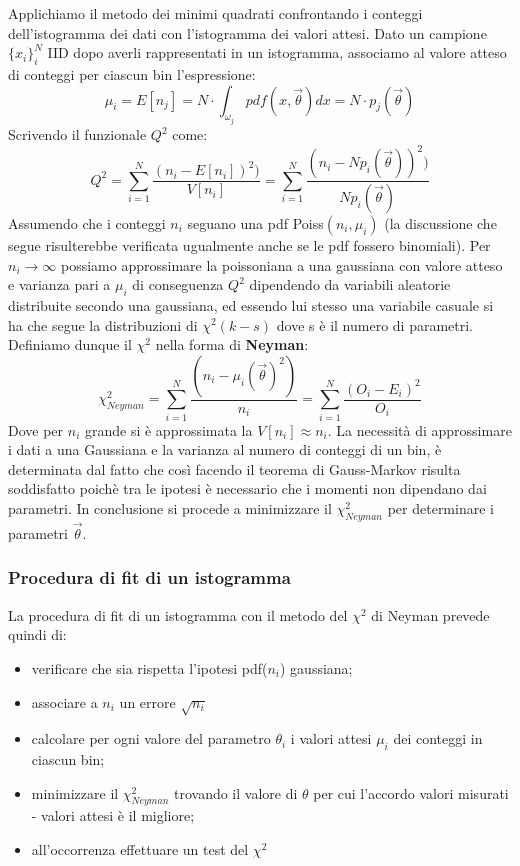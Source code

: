 \documentclass[11pt,a4paper]{book}
\begin{document}
Applichiamo il metodo dei minimi quadrati confrontando i conteggi dell'istogramma dei dati con l'istogramma dei valori attesi. Dato un campione $\{x_i\}_i^N$ IID dopo averli rappresentati in un istogramma, associamo al valore atteso di conteggi per ciascun bin l'espressione:
\begin{equation*}
	\mu_i = E[n_j] = N \cdot \int_{\omega_j}pdf(x, \vec{\theta})dx = N \cdot p_j(\vec{\theta}) 
\end{equation*}
Scrivendo il funzionale $Q^2$ come:
\begin{equation*}
Q^2 = \sum_{i=1}^N\dfrac{(n_i - E[n_i])^2)}{V[n_i]}	 = \sum_{i=1}^N\dfrac{(n_i - Np_i(\vec{\theta}))^2)}{Np_i(\vec{\theta})} 
\end{equation*}
Assumendo che i conteggi $n_i$ seguano una pdf Poiss$(n_i,\mu_i)$ (la discussione che segue risulterebbe verificata ugualmente anche se le pdf fossero binomiali). Per $n_i \rightarrow \infty$ possiamo approssimare la poissoniana a una gaussiana con valore atteso e varianza pari a $\mu_i$ di conseguenza $Q^2$ dipendendo da variabili aleatorie distribuite secondo una gaussiana, ed essendo lui stesso una variabile casuale si ha che segue la distribuzioni di $\chi^2(k-s)$ dove s \`{e} il numero di parametri. Definiamo dunque il $\chi^2$ nella forma di \textbf{Neyman}:
\begin{equation}
	\chi^2_{Neyman} = \sum_{i=1}^N\dfrac{(n_i - \mu_i(\vec{\theta})^2)}{n_i} = \sum_{i=1}^N\dfrac{(O_i - E_i)^2}{O_i}
\end{equation} 
Dove per $n_i$ grande si \`{e} approssimata la $V[n_i] \approx n_i$. La necessit\`{a} di approssimare i dati a una Gaussiana e la varianza al numero di conteggi di un bin, \`{e} determinata dal fatto che cos\`{i} facendo il teorema di Gauss-Markov risulta soddisfatto poich\`{e} tra le ipotesi \`{e} necessario che i momenti non dipendano dai parametri. In conclusione si procede a minimizzare il $\chi^2_{Neyman}$ per determinare i parametri $\vec{\theta}$.

\subsubsection{Procedura di fit di un istogramma}
La procedura di fit di un istogramma con il metodo del $\chi^2$ di Neyman prevede quindi di:

\begin{itemize}
	\item verificare che sia rispetta l'ipotesi pdf($n_i$) gaussiana;
	\item associare a $n_i$ un errore $\sqrt{n_i}$
	\item calcolare per ogni valore del parametro $\theta_i$ i valori attesi $\mu_i$ dei conteggi in ciascun bin;
	\item minimizzare il $\chi^2_{Neyman}$ trovando il valore di $\theta$ per cui l'accordo valori misurati - valori attesi \`{e} il migliore;
	\item all'occorrenza effettuare un test del $\chi^2$
	\end{itemize}
	
\end{document}
